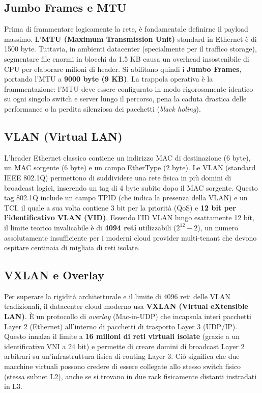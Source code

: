 \subsection{Jumbo Frames e MTU}
Prima di frammentare logicamente la rete, è fondamentale definirne il payload massimo. L'\textbf{MTU (Maximum Transmission Unit)} standard in Ethernet è di 1500 byte. Tuttavia, in ambienti datacenter (specialmente per il traffico storage), segmentare file enormi in blocchi da 1.5 KB causa un overhead insostenibile di CPU per elaborare milioni di header. Si abilitano quindi i \textbf{Jumbo Frames}, portando l'MTU a \textbf{9000 byte (9 KB)}.
La trappola operativa è la frammentazione: l'MTU deve essere configurato in modo rigorosamente identico su ogni singolo switch e server lungo il percorso, pena la caduta drastica delle performance o la perdita silenziosa dei pacchetti (\textit{black holing}).

\subsection{VLAN (Virtual LAN)}
L'header Ethernet classico contiene un indirizzo MAC di destinazione (6 byte), un MAC sorgente (6 byte) e un campo EtherType (2 byte). Le VLAN (standard IEEE 802.1Q) permettono di suddividere una rete fisica in più domini di broadcast logici, inserendo un tag di 4 byte subito dopo il MAC sorgente. 
Questo tag 802.1Q include un campo TPID (che indica la presenza della VLAN) e un TCI, il quale a sua volta contiene 3 bit per la priorità (QoS) e \textbf{12 bit per l'identificativo VLAN (VID)}. Essendo l'ID VLAN lungo esattamente 12 bit, il limite teorico invalicabile è di \textbf{4094 reti} utilizzabili ($2^{12}-2$), un numero assolutamente insufficiente per i moderni cloud provider multi-tenant che devono ospitare centinaia di migliaia di reti isolate.

\subsection{VXLAN e Overlay}
Per superare la rigidità architetturale e il limite di 4096 reti delle VLAN tradizionali, il datacenter cloud moderno usa \textbf{VXLAN (Virtual eXtensible LAN)}. È un protocollo di \textit{overlay} (Mac-in-UDP) che incapsula interi pacchetti Layer 2 (Ethernet) all'interno di pacchetti di trasporto Layer 3 (UDP/IP). 
Questo innalza il limite a \textbf{16 milioni di reti virtuali isolate} (grazie a un identificativo VNI a 24 bit) e permette di creare domini di broadcast Layer 2 arbitrari su un'infrastruttura fisica di routing Layer 3. Ciò significa che due macchine virtuali possono credere di essere collegate allo stesso switch fisico (stessa subnet L2), anche se si trovano in due rack fisicamente distanti instradati in L3.

